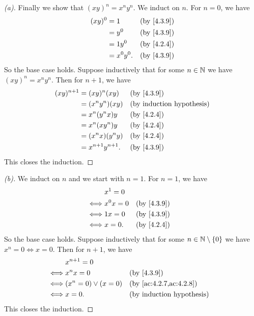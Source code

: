 \begin{proof}[(a)]
  Finally we show that \((xy)^n = x^n y^n\).
  We induct on \(n\).
  For \(n = 0\), we have
  \begin{align*}
    (xy)^0 & = 1        &  & \by{4.3.9} \\
           & = y^0      &  & \by{4.3.9} \\
           & = 1y^0     &  & \by{4.2.4} \\
           & = x^0 y^0. &  & \by{4.3.9}
  \end{align*}
  So the base case holds.
  Suppose inductively that for some \(n \in \mathbb{N}\) we have \((xy)^n = x^n y^n\).
  Then for \(n + 1\), we have
  \begin{align*}
    (xy)^{n + 1} & = (xy)^n (xy)          &  & \by{4.3.9} \\
                 & = (x^n y^n) (xy)       &  & \byIH      \\
                 & = x^n (y^n x) y        &  & \by{4.2.4} \\
                 & = x^n (x y^n) y        &  & \by{4.2.4} \\
                 & = (x^n x)(y^n y)       &  & \by{4.2.4} \\
                 & = x^{n + 1} y^{n + 1}. &  & \by{4.3.9}
  \end{align*}
  This closes the induction.
\end{proof}

\begin{proof}[(b)]
  We induct on \(n\) and we start with \(n = 1\).
  For \(n = 1\), we have
  \begin{align*}
         & x^1 = 0                   \\
    \iff & x^0 x = 0 &  & \by{4.3.9} \\
    \iff & 1x = 0    &  & \by{4.3.9} \\
    \iff & x = 0.    &  & \by{4.2.4}
  \end{align*}
  So the base case holds.
  Suppose inductively that for some \(n \in \mathbb{N} \setminus \left\lbrace0\right\rbrace\) we have \(x^n = 0 \iff x = 0\).
  Then for \(n + 1\), we have
  \begin{align*}
         & x^{n + 1} = 0                                      \\
    \iff & x^n x = 0              &  & \by{4.3.9}             \\
    \iff & (x^n = 0) \lor (x = 0) &  & \by{ac:4.2.7,ac:4.2.8} \\
    \iff & x = 0.                 &  & \byIH
  \end{align*}
  This closes the induction.
\end{proof}

